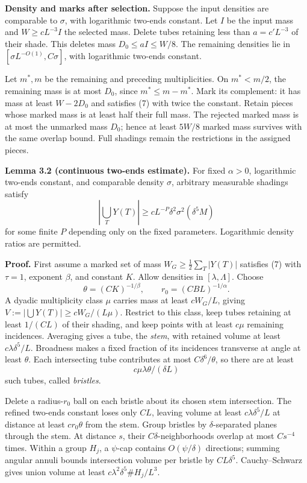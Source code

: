 \documentclass[
  11pt,
  a4paper,
]{article}
\begin{document}
\textbf{Density and marks after selection.} Suppose the input densities
are comparable to \(\sigma\), with logarithmic two-ends constant. Let
\(I\) be the input mass and \(W\ge cL^{-3}I\) the selected mass. Delete
tubes retaining less than \(a=c'L^{-3}\) of their shade. This deletes
mass \(D_0\le aI\le W/8\). The remaining densities lie in
\([\sigma L^{-O(1)},C\sigma]\), with logarithmic two-ends constant.

Let \(m^*,m\) be the remaining and preceding multiplicities. On
\(m^*<m/2\), the remaining mass is at most \(D_0\), since
\(m^*\le m-m^*\). Mark its complement: it has mass at least \(W-2D_0\)
and satisfies (7) with twice the constant. Retain pieces whose marked
mass is at least half their full mass. The rejected marked mass is at
most the unmarked mass \(D_0\); hence at least \(5W/8\) marked mass
survives with the same overlap bound. Full shadings remain the
restrictions in the assigned pieces.

\textbf{Lemma 3.2 (continuous two-ends estimate).} For fixed
\(\alpha>0\), logarithmic two-ends constant, and comparable density
\(\sigma\), arbitrary measurable shadings satisfy \[
 \left|\bigcup_TY(T)\right|
 \ge cL^{-P}\delta^2\sigma^2(\delta^5M)
\tag{8}\label{eq:8}
\] for some finite \(P\) depending only on the fixed parameters.
Logarithmic density ratios are permitted.

\textbf{Proof.} First assume a marked set of mass
\(W_G\ge\frac12\sum_T|Y(T)|\) satisfies (7) with \(\tau=1\), exponent
\(\beta\), and constant \(K\). Allow densities in \([\lambda,\Lambda]\).
Choose \[
 \theta=(CK)^{-1/\beta},\qquad r_0=(CBL)^{-1/\alpha}.
\] A dyadic multiplicity class \(\mu\) carries mass at least \(cW_G/L\),
giving \(V:=|\bigcup Y(T)|\ge cW_G/(L\mu)\). Restrict to this class,
keep tubes retaining at least \(1/(CL)\) of their shading, and keep
points with at least \(c\mu\) remaining incidences. Averaging gives a
tube, the \emph{stem}, with retained volume at least
\(c\lambda\delta^5/L\). Broadness makes a fixed fraction of its
incidences transverse at angle at least \(\theta\). Each intersecting
tube contributes at most \(C\delta^6/\theta\), so there are at least \[
 c\mu\lambda\theta/(\delta L)
\] such tubes, called \emph{bristles}.

Delete a radius-\(r_0\) ball on each bristle about its chosen stem
intersection. The refined two-ends constant loses only \(CL\), leaving
volume at least \(c\lambda\delta^5/L\) at distance at least
\(cr_0\theta\) from the stem. Group bristles by \(\delta\)-separated
planes through the stem. At distance \(s\), their
\(C\delta\)-neighborhoods overlap at most \(Cs^{-4}\) times. Within a
group \(H_j\), a \(\psi\)-cap contains \(O(\psi/\delta)\) directions;
summing angular annuli bounds intersection volume per bristle by
\(CL\delta^5\). Cauchy--Schwarz gives union volume at least
\(c\lambda^2\delta^5\#H_j/L^3\).
\end{document}
